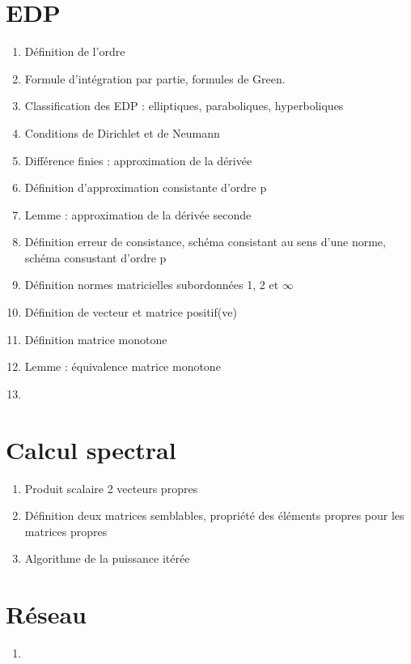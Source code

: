 \documentclass{article}
\begin{document}
\part{EDP}
\begin{enumerate}
\item Définition de l'ordre
\item Formule d'intégration par partie, formules de Green.
\item Classification des EDP : elliptiques, paraboliques, hyperboliques
\item Conditions de Dirichlet et de Neumann
\item Différence finies : approximation de la dérivée
\item Définition d'approximation consistante d'ordre p
\item Lemme : approximation de la dérivée seconde
\item Définition erreur de consistance, schéma consistant au sens d'une norme, schéma consustant d'ordre p
\item Définition normes matricielles subordonnées 1, 2 et $\infty$
\item Définition de vecteur et matrice positif(ve)
\item Définition matrice monotone
\item Lemme : équivalence matrice monotone
\item 
\end{enumerate}

\part{Calcul spectral}
\begin{enumerate}
\item Produit scalaire 2 vecteurs propres
\item Définition deux matrices semblables, propriété des éléments propres pour les matrices propres
\item Algorithme de la puissance itérée
\end{enumerate}

\part{Réseau}
\begin{enumerate}
\item 
\end{enumerate}
\end{document}
